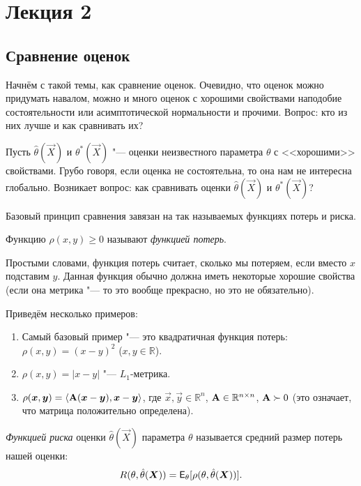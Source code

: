 \section{Лекция 2}
\subsection{Сравнение оценок}
Начнём с такой темы, как сравнение оценок. Очевидно, что оценок можно придумать навалом, можно и много оценок с хорошими свойствами наподобие состоятельности или асимптотической нормальности и прочими. Вопрос: кто из них лучше и как сравнивать их?

Пусть $\hat{\theta}(\vec{X})$ и $\theta^{*}(\vec{X})$ "--- оценки неизвестного параметра $\theta$ с <<хорошими>> свойствами. Грубо говоря, если оценка не состоятельна, то она нам не интересна глобально. Возникает вопрос: как сравнивать оценки $\hat{\theta}(\vec{X})$ и $\theta^{*}(\vec{X})$?

Базовый принцип сравнения завязан на так называемых функциях потерь и риска. 
\begin{definition}
	Функцию $\rho(x, y) \geq 0$ называют \emph{функцией потерь}.
\end{definition}
Простыми словами, функция потерь считает, сколько мы потеряем, если вместо $x$ подставим $y$. Данная функция обычно должна иметь некоторые хорошие свойства (если она метрика "--- то это вообще прекрасно, но это не обязательно).

Приведём несколько примеров:
\begin{enumerate}[label=(\alph*)]
	\item Самый базовый пример "--- это квадратичная функция потерь: $\rho(x, y) = (x - y)^{2}$ ($x, y \in \mathbb{R}$).
	\item $\rho(x, y) = |x - y|$ "--- $L_{1}$-метрика.
	\item $\rho(\bm{x}, \bm{y}) = \langle \mathbf{A}(\bm{x} - \bm{y}), \bm{x} - \bm{y}\rangle$, где $\vec{x}, \vec{y} \in \mathbb{R}^{n}$, $\mathbf{A} \in \mathbb{R}^{n \times n}$, $\mathbf{A} \succ 0$ (это означает, что матрица положительно определена).
\end{enumerate}

\begin{definition}
	\emph{Функцией риска} оценки $\hat{\theta}(\vec{X})$ параметра $\theta$ называется средний размер потерь нашей оценки:
	\[
		R(\theta, \hat{\theta}(\bm{X})) = \operatorname{\mathsf{E}}_{\theta}[\rho(\theta, \hat{\theta}(\bm{X}))].
	\]
\end{definition}

